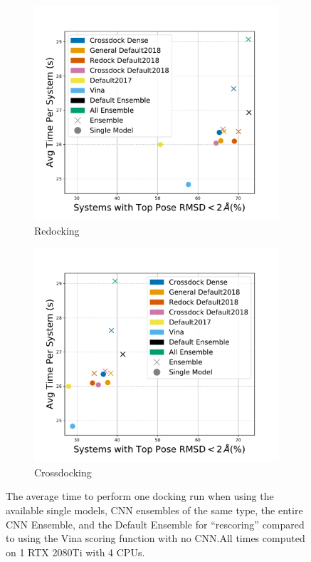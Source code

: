 \documentclass[journal=jcisd8,manuscript=article]{achemso}
\begin{document}
\begin{figure}    
        \begin{subfigure}[b]{0.48\textwidth}
               \centering
               \includegraphics[width=\textwidth]{figures/redocking/gpu_models_line_rescore.pdf}
               \caption{Redocking}
               \label{fig:OptimalRescRD}
        \end{subfigure}    
        \begin{subfigure}[b]{0.48\textwidth}
               \centering
               \includegraphics[width=\textwidth]{figures/crossdocking/gpu_models_line_rescore.pdf}
               \caption{Crossdocking}
               \label{fig:OptimalRescCD}
        \end{subfigure}    
        \caption{The average time to perform one docking run when using the available single models, CNN ensembles of the same type, the entire CNN Ensemble, and the Default Ensemble for ``rescoring'' compared to using the Vina scoring function with no CNN.\@ All times computed on 1 RTX 2080Ti with 4 CPUs.}
        \label{fig:OptimalRescore}
\end{figure}    
\end{document}
